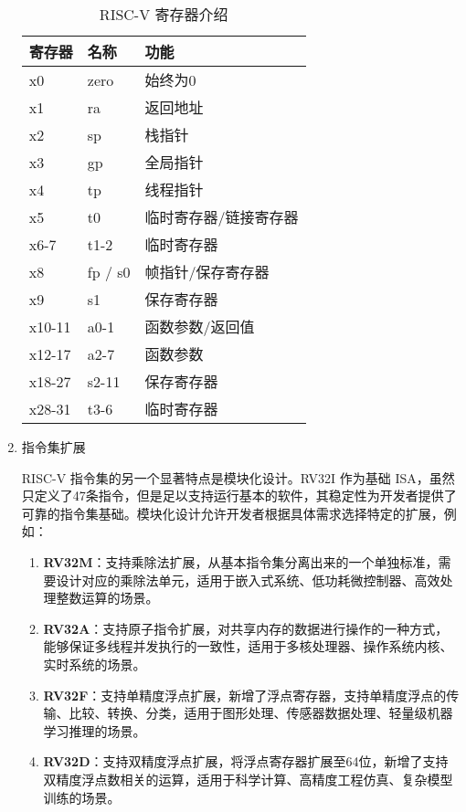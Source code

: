 \begin{enumerate}[label={(\arabic*)},itemsep=0pt, parsep=0pt]
	      \begin{table}[htbp]
		      \centering
		      \caption{RISC-V 寄存器介绍}
		      \begin{tabularx}{\textwidth}{>{\centering\arraybackslash}X >{\centering\arraybackslash}X >{\centering\arraybackslash}X}
			      \toprule
			      \textbf{寄存器} & \textbf{名称} & \textbf{功能} \\
			      \midrule
			      x0           & zero        & 始终为0        \\
			      x1           & ra          & 返回地址        \\
			      x2           & sp          & 栈指针         \\
			      x3           & gp          & 全局指针        \\
			      x4           & tp          & 线程指针        \\
			      x5           & t0          & 临时寄存器/链接寄存器 \\
			      x6-7         & t1-2        & 临时寄存器       \\
			      x8           & fp / s0     & 帧指针/保存寄存器   \\
			      x9           & s1          & 保存寄存器       \\
			      x10-11       & a0-1        & 函数参数/返回值    \\
			      x12-17       & a2-7        & 函数参数        \\
			      x18-27       & s2-11       & 保存寄存器       \\
			      x28-31       & t3-6        & 临时寄存器       \\
			      \bottomrule
		      \end{tabularx}
		      \label{tab:riscv_instruction_register}
	      \end{table}

	\item 指令集扩展

	      RISC-V 指令集的另一个显著特点是模块化设计。RV32I 作为基础 ISA，虽然只定义了47条指令，但是足以支持运行基本的软件，其稳定性为开发者提供了可靠的指令集基础。模块化设计允许开发者根据具体需求选择特定的扩展，例如：
	      \begin{enumerate}[]
		      \item \textbf{RV32M}：支持乘除法扩展，从基本指令集分离出来的一个单独标准，需要设计对应的乘除法单元，适用于嵌入式系统、低功耗微控制器、高效处理整数运算的场景。
		      \item \textbf{RV32A}：支持原子指令扩展，对共享内存的数据进行操作的一种方式，能够保证多线程并发执行的一致性，适用于多核处理器、操作系统内核、实时系统的场景。
		      \item \textbf{RV32F}：支持单精度浮点扩展，新增了浮点寄存器，支持单精度浮点的传输、比较、转换、分类，适用于图形处理、传感器数据处理、轻量级机器学习推理的场景。
		      \item \textbf{RV32D}：支持双精度浮点扩展，将浮点寄存器扩展至64位，新增了支持双精度浮点数相关的运算，适用于科学计算、高精度工程仿真、复杂模型训练的场景。
	      \end{enumerate}


\end{enumerate}
